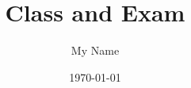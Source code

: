 \documentclass{equation-sheet}
\title{Class and Exam}
\author{My Name}
\date{\today}
\begin{document}
\vfill
\maketitle
\end{document}
